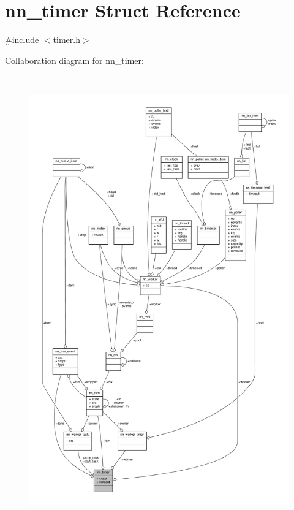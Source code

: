 \hypertarget{structnn__timer}{}\section{nn\+\_\+timer Struct Reference}
\label{structnn__timer}


{\ttfamily \#include $<$timer.\+h$>$}



Collaboration diagram for nn\+\_\+timer\+:\nopagebreak
\begin{figure}[H]
\begin{center}
\leavevmode
\includegraphics[height=550pt]{structnn__timer__coll__graph}
\end{center}
\end{figure}
